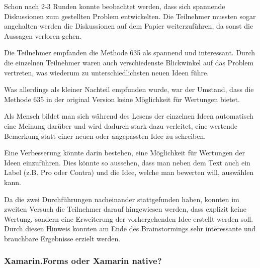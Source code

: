 \begin{description}[leftmargin=!,labelwidth=\widthof{\bfseries Zielstrebige Lösungsfindung }]
	\item[Diskussion gestartet] Schon nach 2-3 Runden konnte beobachtet werden, dass sich spannende Diskussionen zum gestellten Problem entwickelten. Die Teilnehmer mussten sogar angehalten werden die Diskussionen auf dem Papier weiterzuführen, da sonst die Aussagen verloren gehen.
	
	\item[Interessante Methode] Die Teilnehmer empfanden die Methode 635 als spannend und interessant. Durch die einzelnen Teilnehmer waren auch verschiedenste Blickwinkel auf das Problem vertreten, was wiederum zu unterschiedlichsten neuen Ideen führe.
	
	\item[Wertung einführen] Was allerdings als kleiner Nachteil empfunden wurde, war der Umstand, dass die Methode 635 in der original Version keine Möglichkeit für Wertungen bietet. 
	
	Als Mensch bildet man sich während des Lesens der einzelnen Ideen automatisch eine Meinung darüber und wird dadurch stark dazu verleitet, eine wertende Bemerkung statt einer neuen oder angepassten Idee zu schreiben.
	
	Eine Verbesserung könnte darin bestehen, eine Möglichkeit für Wertungen der Ideen einzuführen. Dies könnte so aussehen, dass man neben dem Text auch ein Label (z.B. Pro oder Contra) und die Idee, welche man bewerten will, auswählen kann.
	
	\item[Zielstrebige Lösungsfindung] Da die zwei Durchführungen nacheinander stattgefunden haben, konnten im zweiten Versuch die Teilnehmer darauf hingewiesen werden, dass explizit keine Wertung, sondern eine Erweiterung der vorhergehenden Idee erstellt werden soll. Durch diesen Hinweis konnten am Ende des Brainstormings sehr interessante und brauchbare Ergebnisse erzielt werden.
\end{description}

\subsubsection{Xamarin.Forms oder Xamarin native?}

